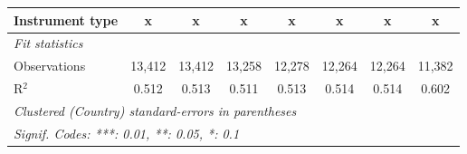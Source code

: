 \begin{table}[htbp]
\begin{tabular}{lccccccc}
      Instrument type                                                     & x              & x             & x            & x            & x             & x             & x\\  
      \midrule \emph{Fit statistics}\\
      Observations                                                        & 13,412         & 13,412        & 13,258       & 12,278       & 12,264        & 12,264        & 11,382\\  
      R$^2$                                                               & 0.512          & 0.513         & 0.511        & 0.513        & 0.514         & 0.514         & 0.602\\  
      \midrule
      \multicolumn{8}{l}{\emph{Clustered (Country) standard-errors in parentheses}}\\
      \multicolumn{8}{l}{\emph{Signif. Codes: ***: 0.01, **: 0.05, *: 0.1}}\\
   \end{tabular}
\end{table}


